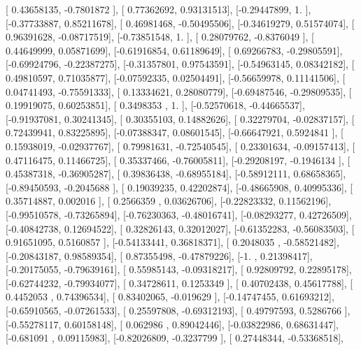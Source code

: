 \documentclass{article}
\begin{document}
       [ 0.43658135, -0.7801872 ],
       [ 0.77362692,  0.93131513],
       [-0.29447899,  1.        ],
       [-0.37733887,  0.85211678],
       [ 0.46981468, -0.50495506],
       [-0.34619279,  0.51574074],
       [ 0.96391628, -0.08717519],
       [-0.73851548,  1.        ],
       [ 0.28079762, -0.8376049 ],
       [ 0.44649999,  0.05871699],
       [-0.61916854,  0.61189649],
       [ 0.69266783, -0.29805591],
       [-0.69924796, -0.22387275],
       [-0.31357801,  0.97543591],
       [-0.54963145,  0.08342182],
       [ 0.49810597,  0.71035877],
       [-0.07592335,  0.02504491],
       [-0.56659978,  0.11141506],
       [ 0.04741493, -0.75591333],
       [ 0.13334621,  0.28080779],
       [-0.69487546, -0.29809535],
       [ 0.19919075,  0.60253851],
       [ 0.3498353 ,  1.        ],
       [-0.52570618, -0.44665537],
       [-0.91937081,  0.30241345],
       [ 0.30355103,  0.14882626],
       [ 0.32279704, -0.02837157],
       [ 0.72439941,  0.83225895],
       [-0.07388347,  0.08601545],
       [-0.66647921,  0.5924841 ],
       [ 0.15938019, -0.02937767],
       [ 0.79981631, -0.72540545],
       [ 0.23301634, -0.09157413],
       [ 0.47116475,  0.11466725],
       [ 0.35337466, -0.76005811],
       [-0.29208197, -0.1946134 ],
       [ 0.45387318, -0.36905287],
       [ 0.39836438, -0.68955184],
       [-0.58912111,  0.68658365],
       [-0.89450593, -0.2045688 ],
       [ 0.19039235,  0.42202874],
       [-0.48665908,  0.40995336],
       [ 0.35714887,  0.002016  ],
       [ 0.2566359 ,  0.03626706],
       [-0.22823332,  0.11562196],
       [-0.99510578, -0.73265894],
       [-0.76230363, -0.48016741],
       [-0.08293277,  0.42726509],
       [-0.40842738,  0.12694522],
       [ 0.32826143,  0.32012027],
       [-0.61352283, -0.56083503],
       [ 0.91651095,  0.5160857 ],
       [-0.54133441,  0.36818371],
       [ 0.2048035 , -0.58521482],
       [-0.20843187,  0.98589354],
       [ 0.87355498, -0.47879226],
       [-1.        ,  0.21398417],
       [-0.20175055, -0.79639161],
       [ 0.55985143, -0.09318217],
       [ 0.92809792,  0.22895178],
       [-0.62744232, -0.79934077],
       [ 0.34728611,  0.1253349 ],
       [ 0.40702438,  0.45617788],
       [ 0.4452053 ,  0.74396534],
       [ 0.83402065, -0.019629  ],
       [-0.14747455,  0.61693212],
       [-0.65910565, -0.07261533],
       [ 0.25597808, -0.69312193],
       [ 0.49797593,  0.5286766 ],
       [-0.55278117,  0.60158148],
       [ 0.062986  ,  0.89042446],
       [-0.03822986,  0.68631447],
       [-0.681091  ,  0.09115983],
       [-0.82026809, -0.3237799 ],
       [ 0.27448344, -0.53368518],
\end{document}
